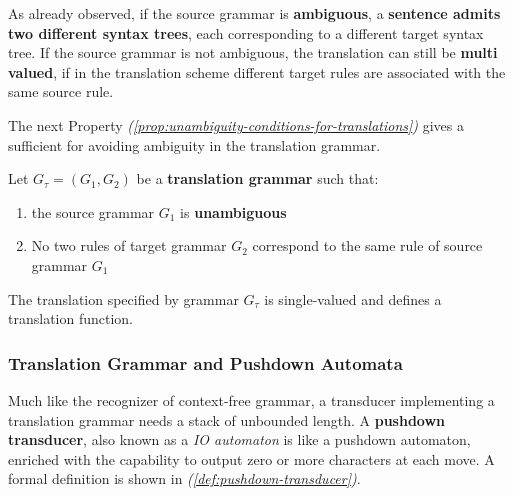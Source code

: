 \documentclass[english]{article}
\begin{document}
As already observed, if the source grammar is \textbf{ambiguous}, a \textbf{sentence admits two different syntax trees}, each corresponding to a different target syntax tree.
If the source grammar is not ambiguous, the translation can still be \textbf{multi valued}, if in the translation scheme different target rules are associated with the same source rule.

The next Property \textit{(\ref{prop:unambiguity-conditions-for-translations})} gives a sufficient for avoiding ambiguity in the translation grammar.

\begin{property}
  \label{prop:unambiguity-conditions-for-translations}
  Let \(G_\tau = \left( G_1, G_2 \right)\) be a \textbf{translation grammar} such that:

  \begin{enumerate}
    \item the source grammar \(G_1\) is \textbf{unambiguous}
    \item No two rules of target grammar \(G_2\) correspond to the same rule of source grammar \(G_1\)
  \end{enumerate}

  The translation specified by grammar \(G_\tau\) is single-valued and defines a translation function.
\end{property}

\subsubsection{Translation Grammar and Pushdown Automata}

Much like the recognizer of context-free grammar, a transducer implementing a translation grammar needs a stack of unbounded length.
A \textbf{pushdown transducer}, also known as a \textit{IO automaton} is like a pushdown automaton, enriched with the capability to output zero or more characters at each move.
A formal definition is shown in \textit{(\ref{def:pushdown-transducer})}.
\end{document}
